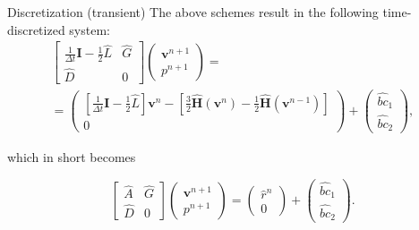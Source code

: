 \documentclass{beamer}
\begin{document}
	\begin{frame}{Discretization (transient)}
	The above schemes result in the following time-discretized system:
	\begin{multline}
		\begin{bmatrix}
			\frac{1}{\Delta t}\mathbf{I}-\frac{1}{2}\hat{L} & \hat{G} \\
			\hat{D} & 0
		\end{bmatrix}
		\begin{pmatrix}
			\boldsymbol{v}^{n+1} \\ 
			p^{n+1}
		\end{pmatrix}=\\
		=
		\begin{pmatrix}
			\left[\frac{1}{\Delta t}\mathbf{I}-\frac{1}{2}\hat{L}\right] \boldsymbol{v}^n - \left[\frac{3}{2}\hat{\mathbf{H}}(\boldsymbol{v}^n) - \frac{1}{2}\hat{\mathbf{H}}(\boldsymbol{v}^{n-1})\right]\\
			0
		\end{pmatrix}
		+
		\begin{pmatrix}
			\hat{bc}_1\\
			\hat{bc}_2
		\end{pmatrix},
	\end{multline}	
	
	which in short becomes
	
	\begin{equation}\label{eqn:NSE-dsm-bl-system-nonint}
	\boxed{\begin{bmatrix}
		\hat{A} & \hat{G} \\
		\hat{D} & 0
	\end{bmatrix}
	\begin{pmatrix}
		\boldsymbol{v}^{n+1} \\ 
		p^{n+1}
	\end{pmatrix}
	=
	\begin{pmatrix}
		\hat{r}^n \\
		0
	\end{pmatrix}
	+
	\begin{pmatrix}
		\hat{bc}_1\\
		\hat{bc}_2
	\end{pmatrix}}.
	\end{equation}
	\end{frame}

	
	
\end{document}
